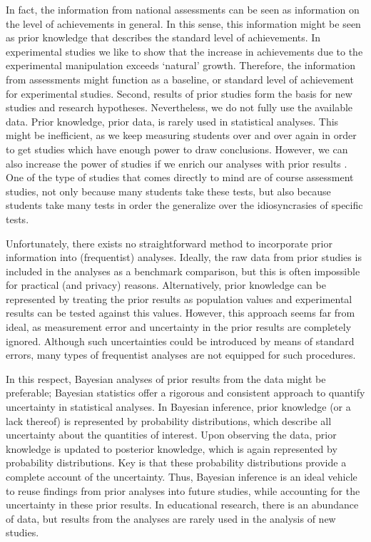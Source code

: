 \documentclass[a4paper]{article}
\begin{document}
In fact, the information from national assessments can be seen as information on the level of achievements in general. In this sense, this information might be seen as prior knowledge that describes the standard level of achievements.  In experimental studies we like to show that the increase in achievements due to the experimental manipulation exceeds `natural' growth. Therefore, the information from assessments might function as a baseline, or standard level of achievement for experimental studies.
Second, results of prior studies form the basis for new studies and research hypotheses. Nevertheless, we do not fully use the available data. Prior knowledge, prior data, is rarely used in statistical analyses. This might be inefficient, as we keep measuring students over and over again in order to get studies which have enough power to draw conclusions. However, we can also increase the power of studies if we enrich our analyses with prior results \cite{graham2014conducting}. One of the type of studies that comes directly to mind are of course assessment studies, not only because many students take these tests, but also because students take many tests in order the generalize over the idiosyncrasies of specific tests.

Unfortunately, there exists no straightforward method to incorporate prior information into (frequentist) analyses. Ideally, the raw data from prior studies is included in the analyses as a benchmark comparison, but this is often impossible for practical (and privacy) reasons. Alternatively, prior knowledge can be represented by treating the prior results as population values and experimental results can be tested against this values. However, this approach seems far from ideal, as measurement error and uncertainty in the prior results are completely ignored. Although such uncertainties could be introduced by means of standard errors, many types of frequentist analyses are not equipped for such procedures.

In this respect, Bayesian analyses of prior results from the data might be preferable; Bayesian statistics offer a rigorous and consistent approach to quantify uncertainty in statistical analyses. In Bayesian inference, prior knowledge (or a lack thereof) is represented by probability distributions, which describe all uncertainty about the quantities of interest. Upon observing the data, prior knowledge is updated to posterior knowledge, which is again represented by probability distributions. Key is that these probability distributions provide a complete account of the uncertainty. Thus, Bayesian inference is an ideal vehicle to reuse findings from prior analyses into future studies, while accounting for the uncertainty in these prior results. In educational research, there is an abundance of data, but results from the analyses are rarely used in the analysis of new studies.
\end{document}
